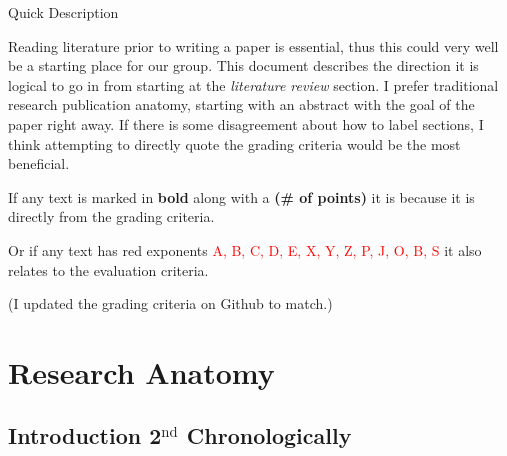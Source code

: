 \setcounter{chapter}{1}
\centerline{Quick Description}
 Reading literature prior to writing a paper is essential, thus this could very well be a starting place for our group. 
 This document describes the direction it is logical to go in from starting at the \emph{literature review} section. 
 I prefer traditional research publication anatomy, starting with an abstract with the goal of the paper right away. 
 If there is some disagreement about how to label sections, I think attempting to directly quote the grading criteria would be the most beneficial. 
 \\

\centerline{If any text is marked in \textbf{bold} along with a \textbf{(\# of points)} it is because it is directly from the grading criteria.
}

\centerline{Or if any text has red exponents \textcolor{red}{A, B, C, D, E, X, Y, Z, P, J, O, B, S} it also relates to the evaluation criteria.}

\centerline{(I updated the grading criteria on Github to match.)}

\section{Research Anatomy}
\subsection{Introduction \textcolor{BurntOrange}{2$^{\text{nd}}$ Chronologically}}

